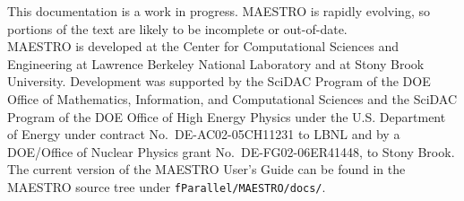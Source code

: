 This documentation is a work in progress.  MAESTRO is rapidly
evolving, so portions of the text are likely to be incomplete or
out-of-date. \\

\noindent MAESTRO is developed at the Center for Computational Sciences and
Engineering at Lawrence Berkeley National Laboratory and at Stony
Brook University.  Development was supported by the SciDAC Program of
the DOE Office of Mathematics, Information, and Computational Sciences
and the SciDAC Program of the DOE Office of High Energy Physics under
the U.S. Department of Energy under contract No.\ DE-AC02-05CH11231 to
LBNL and by a DOE/Office of Nuclear Physics grant No.\
DE-FG02-06ER41448, to Stony Brook. \\

\noindent The current version of the MAESTRO User's Guide can be found in 
the MAESTRO source tree under {\tt fParallel/MAESTRO/docs/}.
